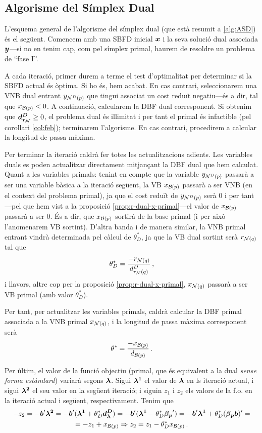 \subsection{Algorisme del Símplex Dual}

L'esquema general de l'algorisme del símplex dual (que està resumit a 
\ref{alg:ASD}) és el 
següent. Comencem amb una SBFD inicial $\boldsymbol{x}$ i la seva solució dual 
associada $\boldsymbol{y}$---si no en tenim cap, com pel símplex primal, haurem de 
resoldre un problema de ``fase I''. 

A cada iteració, primer durem a terme el test d'optimalitat per determinar si 
la SBFD actual és òptima. Si ho és, hem acabat. En cas contrari, seleccionarem 
una VNB dual entrant ${y_{\mathcal{N}^D(p)}}$ que tingui associat un cost reduït 
negatiu---és a dir, tal que $x_{\mathcal{B}(p)} < 0$. A continuació, calcularem la DBF 
dual corresponent. Si obtenim que $\boldsymbol{d^D_{r_{\mathcal{N}}}} \ge 0$, el problema dual és 
il\lgem limitat i per tant el primal és infactible (pel corol\lgem lari 
\ref{col:feb}); 
terminarem l'algorisme. En cas contrari, procedirem a calcular la longitud de 
passa màxima.

Per terminar la iteració caldrà fer totes les actualitzacions adients. Les 
variables duals es poden actualitzar directament mitjançant la DBF dual que hem 
calculat. Quant a les variables primals: tenint 
en compte que la variable $y_{\mathcal{N}^D(p)}$ passarà a ser una variable 
bàsica a la iteració següent, la VB $x_{\mathcal{B}(p)}$ passarà a ser VNB (en el 
context del problema primal), ja que el 
cost reduït de $y_{\mathcal{N}^D(p)}$ serà 0 i per tant---pel que hem vist a la 
proposició \ref{prop:r-dual-x-primal}---el valor de $x_{\mathcal{B}(p)}$ passarà a ser 
0. És a dir, que $x_{\mathcal{B}(p)}$ sortirà de la base primal (i per això l'anomenarem 
VB sortint). D'altra banda i de manera similar, la VNB primal entrant vindrà
determinada pel càlcul 
de $\theta^\ast_D$, ja que la VB dual sortint serà $r_{\mathcal{N}(q)}$ tal que 
\[\theta_D^\ast = \frac{-r_{\mathcal{N}(q)}}{d^D_{r_{\mathcal{N}}(q)}}\,,\] i llavors, altre cop 
per 
la proposició \ref{prop:r-dual-x-primal}, $x_{\mathcal{N}(q)}$ passarà a ser VB primal 
(amb valor $\theta^\ast_D$).

Per tant, per actualitzar les variables primals, caldrà calcular la DBF primal 
associada a la VNB primal $x_{\mathcal{N}(q)}$, i la longitud de passa màxima 
corresponent serà
\[
	\theta^\ast = \frac{-x_{\mathcal{B}(p)}}{d_{\mathcal{B}(p)}}\,.
\] 

Per últim, el valor de la funció objectiu (primal, que és equivalent a la dual 
\textit{sense forma estàndard}) variarà segons $\boldsymbol{\lambda}$. 
Sigui $\boldsymbol{\lambda^1}$ el valor de $\boldsymbol{\lambda}$ en ls iteració actual, i 
sigui $\boldsymbol{\lambda^2}$ el seu valor en la següent iteració; i siguin $z_1$ i 
$z_2$ els valors de la f.o. en la iteració actual i següent, respectivament. 
Tenim que
\begin{multline*}
	-z_2 = -\boldsymbol{b}'\boldsymbol{\lambda^2} = -\boldsymbol{b}'(\boldsymbol{\lambda^1} + 
	\theta_D^*\boldsymbol{d^D_\lambda}) = -\boldsymbol{b}'(\boldsymbol{\lambda^1} - 
	\theta_D^*\boldsymbol{\beta_p}') = -\boldsymbol{b}'\boldsymbol{\lambda^1} + 
	\theta^*_D(\boldsymbol{\beta_p}\boldsymbol{b})' = \\
	= -z_1 + x_{\mathcal{B}(p)} \Rightarrow z_2 = z_1 - \theta_D^* x_{\mathcal{B}(p)}\,.
\end{multline*}

